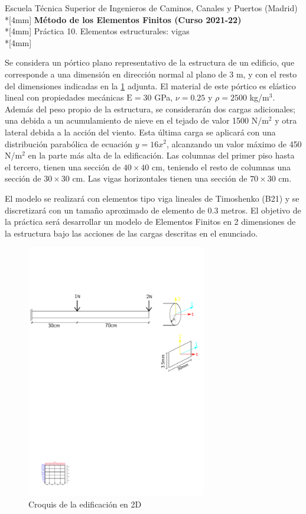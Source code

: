 \documentclass[a4paper,12pt]{article}
\begin{document}
\def\bm#1{{\mbox{\boldmath $#1$}}}
\def\eqdef{\buildrel \rm def \over =}
\def\signo{\mathop{\rm signo}\nolimits}

\mbox{}\vspace*{-20mm}

{\centering
{\small\sc Escuela Técnica Superior de Ingenieros de Caminos, Canales y Puertos (Madrid)}\\*[4mm]
{\Large\bf Método de los Elementos Finitos (Curso 2021-22)}\\*[4mm]
Práctica 10. Elementos estructurales: vigas \\*[4mm]
}


\noindent
Se considera un pórtico plano representativo de la estructura de un edificio, que corresponde a una dimensión en dirección normal al plano de 3 m, y con el resto del dimensiones indicadas en la \cref{fig:croquis} adjunta. El material de este pórtico es elástico lineal con propiedades mecánicas $\text{E}=30$ GPa, $\nu=0.25$ y $\rho=2500$ kg/m$^3$. Además del peso propio de la estructura, se considerarán dos cargas adicionales; una debida a un acumulamiento de nieve en el tejado de valor 1500 N/m$^2$ y otra lateral debida a la acción del viento. Esta última carga se aplicará con una distribución parabólica de ecuación $y=16x^2$, alcanzando un valor máximo de 450 N/m$^2$ en la parte más alta de la edificación.
Las columnas del primer piso hasta el tercero, tienen una sección de $40 \times 40$ cm, teniendo el resto de columnas una sección de $30 \times 30$ cm. Las vigas horizontales tienen una sección de $70 \times 30$ cm.

El modelo se realizará con elementos tipo viga lineales de Timoshenko (B21) y se discretizará con un tamaño aproximado de elemento de 0.3 metros. El objetivo de la práctica será desarrollar un modelo de Elementos Finitos en 2 dimensiones de la estructura bajo las acciones de las cargas descritas en el enunciado.


\vspace{10mm}

\begin{figure}[hb]
    \centering
\includegraphics[width=0.7\textwidth]{RecorteP10}
\caption{Croquis de la edificación en 2D}
\label{fig:croquis}
\end{figure}
\end{document}
